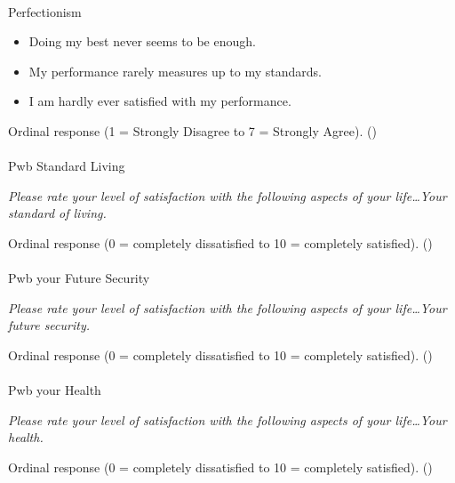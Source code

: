 \documentclass[
  single column]{article}
\makeatletter
\let\oldparagraph\paragraph
\renewcommand{\paragraph}{
    \@ifstar
      \xxxParagraphStar
      \xxxParagraphNoStar
  }
\newcommand{\xxxParagraphStar}[1]{\oldparagraph*{#1}\mbox{}}
\newcommand{\xxxParagraphNoStar}[1]{\oldparagraph{#1}\mbox{}}
\providecommand{\tightlist}{%
  \setlength{\itemsep}{0pt}\setlength{\parskip}{0pt}}\usepackage{longtable,booktabs,array}
\makeatother
\begin{document}
\paragraph{Perfectionism}\label{perfectionism}

\begin{itemize}
\tightlist
\item
  Doing my best never seems to be enough.
\item
  My performance rarely measures up to my standards.
\item
  I am hardly ever satisfied with my performance.
\end{itemize}

Ordinal response (1 = Strongly Disagree to 7 = Strongly Agree).
()

\paragraph{Pwb Standard Living}\label{pwb-standard-living-1}

\emph{Please rate your level of satisfaction with the following aspects
of your life\ldots Your standard of living.}

Ordinal response (0 = completely dissatisfied to 10 = completely
satisfied). ()

\paragraph{Pwb your Future Security}\label{pwb-your-future-security}

\emph{Please rate your level of satisfaction with the following aspects
of your life\ldots Your future security.}

Ordinal response (0 = completely dissatisfied to 10 = completely
satisfied). ()

\paragraph{Pwb your Health}\label{pwb-your-health}

\emph{Please rate your level of satisfaction with the following aspects
of your life\ldots Your health.}

Ordinal response (0 = completely dissatisfied to 10 = completely
satisfied). ()
\end{document}
